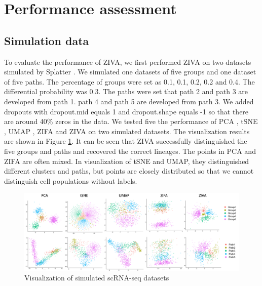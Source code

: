 \section{Performance assessment}
\subsection{Simulation data}
To evaluate the performance of ZIVA, we first performed ZIVA on two datasets simulated by Splatter \cite{zappia2017splatter}. We simulated one datasets of five groups and one dataset of five paths. The percentage of groups were set as 0.1, 0.1, 0.2, 0.2 and 0.4. The differential probability was 0.3. The paths were set that path 2 and path 3 are developed from path 1. path 4 and path 5 are developed from path 3. We added dropouts with dropout.mid equals 1 and dropout.shape equals -1 so that there are around 40\% zeros in the data. We tested five the performance of PCA \cite{Abdi2010}, tSNE \cite{maaten2008visualizing}, UMAP \cite{McInnes2018}, ZIFA \cite{Pierson2015} and ZIVA on two simulated datasets. The visualization results are shown in Figure \ref{sim}. It can be seen that ZIVA successfully distinguished the five groups and paths and recovered the correct lineages. The points in PCA and ZIFA are often mixed. In visualization of tSNE and UMAP, they distinguished different clusters and paths, but points are closely distributed so that we cannot distinguish cell populations without labels. 
\begin{figure}[htb!]
    \centering
    \includegraphics[width=1\textwidth]{figures/myfigures/simdata.png}
    \caption{Visualization of simulated scRNA-seq datasets}
    \label{sim}
\end{figure}

\clearpage

